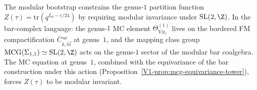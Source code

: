 \begin{remark}[Modular bootstrap = MCG equivariance of the
genus-$1$ bar complex]
\label{rem:modular-bootstrap-bar}%
%
%
The modular bootstrap constrains the genus-$1$ partition function
$Z(\tau) = \mathrm{tr}(q^{L_0 - c/24})$ by requiring modular
invariance under $\mathrm{SL}(2,\Z)$. In the bar-complex
language: the genus-$1$ MC element
$\Theta^{(1)}_{\mathrm{Vir}_c}$ lives on the bordered FM
compactification $\overline{C}{}^{\,\mathrm{oc}}_{k,\vec{m}}$
at genus~$1$, and the mapping class group
$\mathrm{MCG}(\Sigma_{1,1}) \simeq \mathrm{SL}(2,\Z)$ acts on
the genus-$1$ sector of the modular bar coalgebra. The MC
equation at genus~$1$, combined with the equivariance of the bar
construction under this action
(Proposition~\ref{V1-prop:mcg-equivariance-tower}), forces
$Z(\tau)$ to be modular invariant.


\end{remark}
